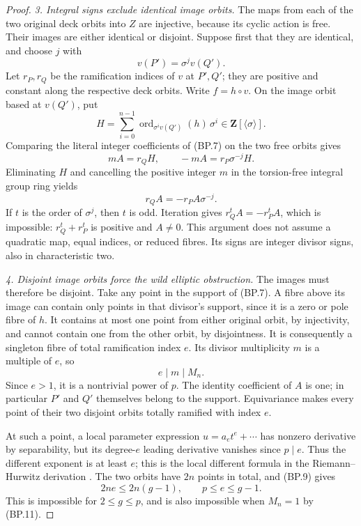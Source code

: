 \begin{proof}
\emph{3. Integral signs exclude identical image orbits.}
The maps from each of the two original deck orbits into $Z$
are injective, because its cyclic action is free. Their images
are either identical or disjoint.
Suppose first that they are identical, and choose $j$ with
\[
                         v(P')=\sigma^jv(Q').
\]
Let $r_P,r_Q$ be the ramification indices of $v$ at $P',Q'$;
they are positive and constant along the respective deck orbits.
Write $f=h\circ v$. On the image orbit based at $v(Q')$, put
\[
 H=\sum_{i=0}^{n-1}
       \operatorname{ord}_{\sigma^iv(Q')}(h)\,\sigma^i
                         \in\mathbf Z[\langle\sigma\rangle].
\]
Comparing the literal integer coefficients of (BP.7) on the
two free orbits gives
\[
           mA=r_QH,\qquad -mA=r_P\sigma^{-j}H.
\]
Eliminating $H$ and cancelling the positive integer $m$ in
the torsion-free integral group ring yields
\[
                        r_QA=-r_PA\sigma^{-j}.
 \tag{BP.10}
\]
If $t$ is the order of $\sigma^j$, then $t$ is odd. Iteration
gives $r_Q^tA=-r_P^tA$, which is impossible: $r_Q^t+r_P^t$
is positive and $A\ne0$. This argument does not assume a
quadratic map, equal indices, or reduced fibres. Its signs
are integer divisor signs, also in characteristic two.

\emph{4. Disjoint image orbits force the wild elliptic obstruction.}
The images must therefore be disjoint. Take any point in the
support of (BP.7). A fibre above its image can contain only
points in that divisor's support, since it is a zero or pole
fibre of $h$. It contains at most one point from either original
orbit, by injectivity, and cannot contain one from the other
orbit, by disjointness. It is consequently a singleton fibre
of total ramification index $e$. Its divisor multiplicity
$m$ is a multiple of $e$, so
\[
                         e\mid m\mid M_n.
 \tag{BP.11}
\]
Since $e>1$, it is a nontrivial power of $p$.
The identity coefficient of $A$ is one; in particular $P'$
and $Q'$ themselves belong to the support. Equivariance makes
every point of their two disjoint orbits totally ramified
with index $e$.

At such a point, a local parameter expression
$u=a_et^e+\cdots$ has nonzero derivative by separability,
but its degree-$e$ leading derivative vanishes since $p\mid e$.
Thus the different exponent is at least $e$; this is the local
different formula in the Riemann--Hurwitz derivation
\cite[Lemma~53.12.4, Tag~\texttt{0C1F}]{StacksRH}.
The two orbits have $2n$ points in total, and (BP.9) gives
\[
                         2ne\le2n(g-1),
                    \qquad p\le e\le g-1.
 \tag{BP.12}
\]
This is impossible for $2\le g\le p$, and is also impossible
when $M_n=1$ by (BP.11).


\end{proof}
